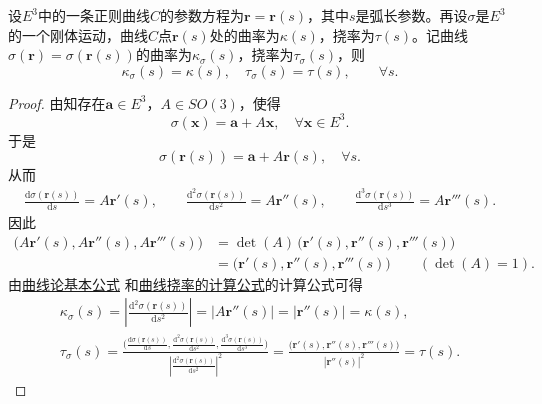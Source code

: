 \documentclass[../../main.tex]{subfiles}%
\begin{document}
\begin{proposition}\label{proposition:曲线的曲率和挠率在刚体运动下不变}
设$E^3$中的一条正则曲线$C$的参数方程为$\bm{r}=\bm{r}(s)$，其中$s$是弧长参数。再设$\sigma$是$E^3$的一个刚体运动，曲线$C$点$\bm{r}(s)$处的曲率为$\kappa(s)$，挠率为$\tau(s)$。记曲线$\sigma(\bm{r})=\sigma(\bm{r}(s))$的曲率为$\kappa_{\sigma}(s)$，挠率为$\tau_{\sigma}(s)$，则
\[
\kappa_{\sigma}(s)=\kappa(s),\quad \tau_{\sigma}(s)=\tau(s),\qquad \forall s.
\]
\end{proposition}
\begin{proof}
由知存在$\bm{a}\in E^3$，$A\in SO(3)$，使得
\[
\sigma(\bm{x})=\bm{a}+A\bm{x},\quad \forall \bm{x}\in E^3.
\]
于是
\[
\sigma(\bm{r}(s))=\bm{a}+A\bm{r}(s),\quad \forall s.
\]
从而
\begin{align*}
\frac{\mathrm{d}\sigma(\bm{r}(s))}{\mathrm{d}s}=A\bm{r}'(s),\qquad 
\frac{\mathrm{d}^2\sigma(\bm{r}(s))}{\mathrm{d}s^2}=A\bm{r}''(s),\qquad 
\frac{\mathrm{d}^3\sigma(\bm{r}(s))}{\mathrm{d}s^3}=A\bm{r}'''(s).
\end{align*}
因此
\begin{align*}
\bigl(A\bm{r}'(s),A\bm{r}''(s),A\bm{r}'''(s)\bigr)
&=\det(A)\,\bigl(\bm{r}'(s),\bm{r}''(s),\bm{r}'''(s)\bigr) \\
&=\bigl(\bm{r}'(s),\bm{r}''(s),\bm{r}'''(s)\bigr) \qquad (\det(A)=1).
\end{align*}
由\hyperref[theorem:曲线论基本公式]{曲线论基本公式}
和\hyperref[theorem:微分几何-曲线挠率的计算公式]{曲线挠率的计算公式}的计算公式可得
\begin{gather*}
\kappa_{\sigma}(s)=\left|\frac{\mathrm{d}^2\sigma(\bm{r}(s))}{\mathrm{d}s^2}\right|
=|A\bm{r}''(s)|=|\bm{r}''(s)|=\kappa(s),\\
\tau_{\sigma}(s)=\frac{\bigl(\frac{\mathrm{d}\sigma(\bm{r}(s))}{\mathrm{d}s},\frac{\mathrm{d}^2\sigma(\bm{r}(s))}{\mathrm{d}s^2},\frac{\mathrm{d}^3\sigma(\bm{r}(s))}{\mathrm{d}s^3}\bigr)}
{\left|\frac{\mathrm{d}^2\sigma(\bm{r}(s))}{\mathrm{d}s^2}\right|^2}
=\frac{\bigl(\bm{r}'(s),\bm{r}''(s),\bm{r}'''(s)\bigr)}{|\bm{r}''(s)|^2}
=\tau(s).
\end{gather*}
\end{proof}
\end{document}
